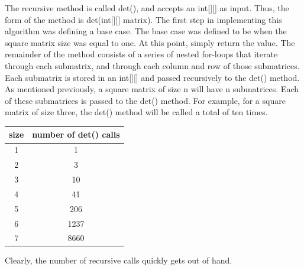 \documentclass[12pt, titlepage]{article}
\begin{document}
The recursive method is called det(), and accepts an int[][] as input. Thus, the form of the method is det(int[][] matrix). The first step in implementing this algorithm was defining a base case. The base case was defined to be when the square matrix size was equal to one. At this point, simply return the value. The remainder of the method consists of a series of nested for-loops that iterate through each submatrix, and through each column and row of those submatrices. Each submatrix is stored in an int[][] and passed recursively to the det() method. As mentioned previously, a square matrix of size n will have n submatrices. Each of these submatrices is passed to the det() method. For example, for a square matrix of size three, the det() method will be called a total of ten times. 


\begin{table}[!htbp]
\centering
\begin{tabular}{|c|c|}
\hline
\multicolumn{1}{|l|}{\textbf{size}} & \multicolumn{1}{l|}{\textbf{number of det() calls}} \\ \hline
1                                   & 1                                                   \\ \hline
2                                   & 3                                                   \\ \hline
3                                   & 10                                                  \\ \hline
4                                   & 41                                                  \\ \hline
5                                   & 206                                                 \\ \hline
6                                   & 1237                                                \\ \hline
7                                   & 8660                                                \\ \hline
\end{tabular}
\end{table}

Clearly, the number of recursive calls quickly gets out of hand.
\end{document}
